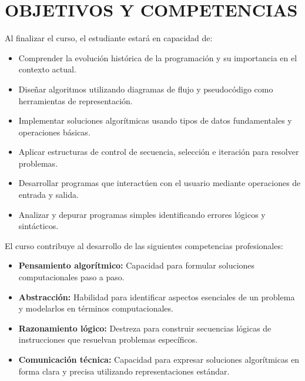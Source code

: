 \documentclass[12pt,a4paper]{article}
\begin{document}
\section{OBJETIVOS Y COMPETENCIAS}

\begin{objetivos}
Al finalizar el curso, el estudiante estará en capacidad de:
\begin{itemize}[leftmargin=*]
    \item Comprender la evolución histórica de la programación y su importancia en el contexto actual.
    \item Diseñar algoritmos utilizando diagramas de flujo y pseudocódigo como herramientas de representación.
    \item Implementar soluciones algorítmicas usando tipos de datos fundamentales y operaciones básicas.
    \item Aplicar estructuras de control de secuencia, selección e iteración para resolver problemas.
    \item Desarrollar programas que interactúen con el usuario mediante operaciones de entrada y salida.
    \item Analizar y depurar programas simples identificando errores lógicos y sintácticos.
\end{itemize}
\end{objetivos}

\begin{competencias}
El curso contribuye al desarrollo de las siguientes competencias profesionales:
\begin{itemize}[leftmargin=*]
    \item \textbf{Pensamiento algorítmico:} Capacidad para formular soluciones computacionales paso a paso.
    \item \textbf{Abstracción:} Habilidad para identificar aspectos esenciales de un problema y modelarlos en términos computacionales.
    \item \textbf{Razonamiento lógico:} Destreza para construir secuencias lógicas de instrucciones que resuelvan problemas específicos.
    \item \textbf{Comunicación técnica:} Capacidad para expresar soluciones algorítmicas en forma clara y precisa utilizando representaciones estándar.
\end{itemize}
\end{competencias}
\vspace{0.5cm}
\end{document}
